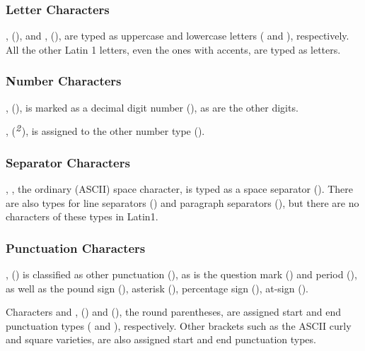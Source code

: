 \subsubsection{Letter Characters}

, 
(), and ,  (), are typed as uppercase and lowercase letters
( and ), respectively.  All the other Latin 1 letters,
even the ones with accents, are typed as letters.


\subsubsection{Number Characters}

,  (), is marked
as a decimal digit number (), as are the other digits.  

,  (${}^{\rm\small
  \mbox{\it 2}}$), is assigned to the other number type
().


\subsubsection{Separator Characters}

, , the ordinary (ASCII) space
character, is typed as a space separator ().  There
are also types for line separators () and paragraph
separators (), but there are no characters of these types
in Latin1.



\subsubsection{Punctuation Characters}

,  (\charmention{!}) is
classified as other punctuation (), as is the question mark
()  and period (), as well as the pound
sign (\charmention{\#}), asterisk (\charmention{*}), percentage sign
(\charmention{\%}), at-sign ().

Characters  and ,  (\charmention{(}) and 
(\charmention{)}), the round parentheses, are assigned start and end
punctuation types ( and ), respectively.  Other
brackets such as the ASCII curly and square varieties, are also
assigned start and end punctuation types.

